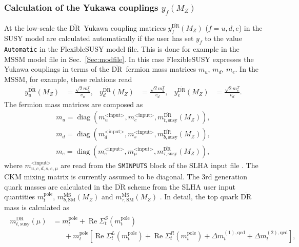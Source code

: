 \documentclass[final,3p,11pt,pdflatex]{elsarticle}
\makeatletter
\newcommand{\fs}{FlexibleSUSY\@\xspace}
\newcommand{\code}[1]{\lstinline|#1|}  %
\newcommand{\textoverline}[1]{$\overline{\mbox{#1}}$}
\newcommand{\DRbar}{\textoverline{DR}\xspace}
\newcommand{\MSbar}{\textoverline{MS}\xspace}
\newcommand{\userinput}{\text{<input>}}
\newcommand{\secref}[1]{Sec.~\ref{#1}}
\DeclareMathOperator{\diag}{diag}
\DeclareMathOperator{\re}{Re}
\makeatother
\begin{document}
\subsubsection{Calculation of the Yukawa couplings $y_f(M_Z)$}
\label{sec:calculation-of-yukawa-couplings}

At the low-scale the \DRbar\ Yukawa coupling matrices
$y_f^{\text{\DRbar}}(M_Z)$ ($f=u,d,e$) in the SUSY model are
calculated automatically if the user has set $y_f$ to the value
\code{Automatic} in the \fs model file.  This is done for example in
the MSSM model file in \secref{Sec:modfile}.  In this case \fs
expresses the Yukawa couplings in terms of the \DRbar\ fermion mass
matrices $m_u$, $m_d$, $m_e$.  In the MSSM, for example, these
relations read
%
\begin{align}
  y_u^{\text{\DRbar}}(M_Z) &= \frac{\sqrt{2} m_{u}^T}{v_u} , &
  y_d^{\text{\DRbar}}(M_Z) &= \frac{\sqrt{2} m_{d}^T}{v_d} , &
  y_e^{\text{\DRbar}}(M_Z) &= \frac{\sqrt{2} m_{e}^T}{v_d}.
\end{align}
%
The fermion mass matrices are composed as
%
\begin{align}
  m_u = \diag(m_{u}^{\userinput}, m_{c}^{\userinput}, m_{t,\text{susy}}^{\text{\DRbar}}(M_Z)) ,\\
  m_d = \diag(m_{d}^{\userinput}, m_{s}^{\userinput}, m_{b,\text{susy}}^{\text{\DRbar}}(M_Z)) ,\\
  m_e = \diag(m_{e}^{\userinput}, m_{\mu}^{\userinput}, m_{\tau,\text{susy}}^{\text{\DRbar}}(M_Z)),
\end{align}
%
where $m_{u,c,d,s,e,\mu}^{\userinput}$ are read from the
\code{SMINPUTS} block of the SLHA input file \cite{Skands:2003cj}.
The CKM mixing matrix is currently assumed to be diagonal.  The 3rd
generation quark masses are calculated in the \DRbar scheme from the
SLHA user input quantities $m_t^\text{pole}$,
$m_{b,\text{SM}}^{\text{\MSbar}}(M_Z)$ and
$m_{\tau,\text{SM}}^{\text{\MSbar}}(M_Z)$ \cite{Skands:2003cj}.  In
detail, the top quark \DRbar mass is calculated as
%
\begin{align}
  \begin{split}
    m_{t,\text{susy}}^{\text{\DRbar}}(\mu) &= m_t^\text{pole} +
    \re\Sigma_{t}^{S}(m_t^\text{pole}) \\
    &\phantom{=\;} + m_t^\text{pole}
    \left[ \re\Sigma_{t}^{L}(m_t^\text{pole}) +
      \re\Sigma_{t}^{R}(m_t^\text{pole}) + \Delta
      m_t^{(1),\text{qcd}} + \Delta m_t^{(2),\text{qcd}} \right] ,
  \end{split}
\end{align}
\end{document}
